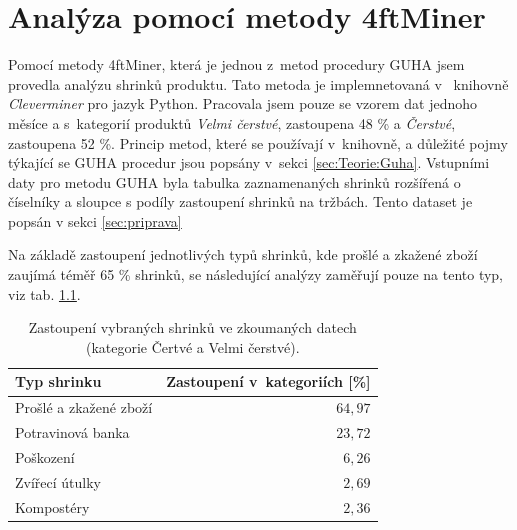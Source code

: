 \chapter{Analýza pomocí metody 4ftMiner}
\label{ch:cleverminer}

Pomocí metody 4ftMiner, která je jednou z~metod procedury GUHA jsem provedla analýzu shrinků produktu. Tato metoda je implemnetovaná v~ knihovně \emph{Cleverminer} pro jazyk Python. Pracovala jsem pouze se vzorem dat jednoho měsíce a s~kategorií produktů \emph{Velmi čerstvé}, zastoupena 48 \% a \emph{Čerstvé}, zastoupena 52 \%. Princip metod, které se používají v~knihovně, a důležité pojmy týkající se GUHA procedur jsou popsány v~sekci \ref*{sec:Teorie:Guha}. Vstupními daty pro metodu GUHA byla tabulka zaznamenaných shrinků rozšířená o číselníky a sloupce s podíly zastoupení shrinků na tržbách. Tento dataset je popsán v sekci \ref{sec:priprava}


Na základě zastoupení jednotlivých typů shrinků, kde prošlé a zkažené zboží zaujímá téměř 65 \% shrinků, se následující analýzy zaměřují pouze na tento typ, viz tab. \ref*{tab:shrinkyZastoupeni}.

\begin{table}[hbtp!]
    \begin{center}
            \captionsetup{justification=centering}
    \caption{Zastoupení vybraných shrinků ve zkoumaných datech \\(kategorie Čertvé a Velmi čerstvé).}
    \begin{tabular}{l r}
        Typ shrinku & Zastoupení v~kategoriích [\%]\\
        \midrule
        Prošlé a zkažené zboží & $64{,}97$ \\
        Potravinová banka & $23{,}72$ \\
         Poškození & $6{,}26$ \\
        Zvířecí útulky & $2{,}69$ \\
        Kompostéry &  $2{,}36$ \\
        \end{tabular}
    \label{tab:shrinkyZastoupeni}
\end{center}
\end{table}

